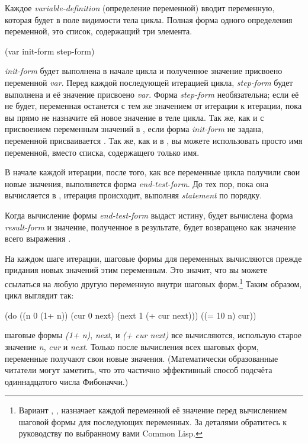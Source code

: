 Каждое \textit{variable-definition} (определение переменной) вводит переменную, которая
будет в поле видимости тела цикла. Полная форма одного определения переменной, это список,
содержащий три элемента.

\begin{myverb}
(var init-form step-form)
\end{myverb}

\textit{init-form} будет выполнена в начале цикла и полученное значение присвоено
переменной \textit{var}.  Перед каждой последующей итерацией цикла, \textit{step-form}
будет выполнена и её значение присвоено \textit{var}.  Форма \textit{step-form}
необязательна; если её не будет, переменная останется с тем же значением от итерации к
итерации, пока вы прямо не назначите ей новое значение в теле цикла. Так же, как и с
присвоением переменным значений в , если форма \textit{init-form} не задана,
переменной присваивается . Так же, как и в , вы можете использовать
просто имя переменной, вместо списка, содержащего только имя.

В начале каждой итерации, после того, как все переменные цикла получили свои новые
значения, выполняется форма \textit{end-test-form}. До тех пор, пока она вычисляется в
, итерация происходит, выполняя \textit{statement} по порядку.

Когда вычисление формы \textit{end-test-form} выдаст истину, будет вычислена форма
\textit{result-form} и значение, полученное в результате, будет возвращено как значение
всего выражения .

На каждом шаге итерации, шаговые формы для переменных вычисляются прежде придания новых
значений этим переменным. Это значит, что вы можете ссылаться на любую другую переменную
внутри шаговых форм.\footnote{Вариант , , назначает каждой переменной
  её значение перед вычислением шаговой формы для последующих переменных. За деталями
  обратитесь к руководству по выбранному вами Common Lisp.} Таким образом, цикл выглядит
так:

\begin{myverb}
(do ((n 0 (1+ n))
     (cur 0 next)
     (next 1 (+ cur next)))
    ((= 10 n) cur))
\end{myverb}

шаговые формы \textit{(1+ n)}, \textit{next}, и \textit{(+ cur next)} все вычисляются,
использую старое значение \textit{n}, \textit{cur} и \textit{next}. Только после
вычисления всех шаговых форм, переменные получают свои новые значения. (Математически
образованные читатели могут заметить, что это частично эффективный способ подсчёта
одиннадцатого числа Фибоначчи.)

